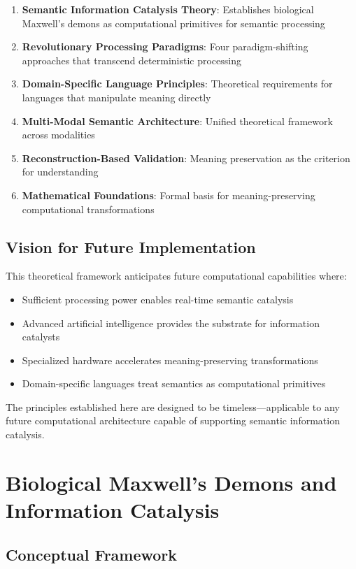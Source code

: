 \documentclass[12pt,a4paper,twoside]{article}
\begin{document}
\begin{enumerate}[label=(\arabic*)]
\item \textbf{Semantic Information Catalysis Theory}: Establishes biological Maxwell's demons as computational primitives for semantic processing
\item \textbf{Revolutionary Processing Paradigms}: Four paradigm-shifting approaches that transcend deterministic processing
\item \textbf{Domain-Specific Language Principles}: Theoretical requirements for languages that manipulate meaning directly
\item \textbf{Multi-Modal Semantic Architecture}: Unified theoretical framework across modalities
\item \textbf{Reconstruction-Based Validation}: Meaning preservation as the criterion for understanding
\item \textbf{Mathematical Foundations}: Formal basis for meaning-preserving computational transformations
\end{enumerate}

\subsection{Vision for Future Implementation}

This theoretical framework anticipates future computational capabilities where:
\begin{itemize}
\item Sufficient processing power enables real-time semantic catalysis
\item Advanced artificial intelligence provides the substrate for information catalysts
\item Specialized hardware accelerates meaning-preserving transformations
\item Domain-specific languages treat semantics as computational primitives
\end{itemize}

The principles established here are designed to be timeless—applicable to any future computational architecture capable of supporting semantic information catalysis.

\section{Biological Maxwell's Demons and Information Catalysis}

\subsection{Conceptual Framework}
\end{document}
